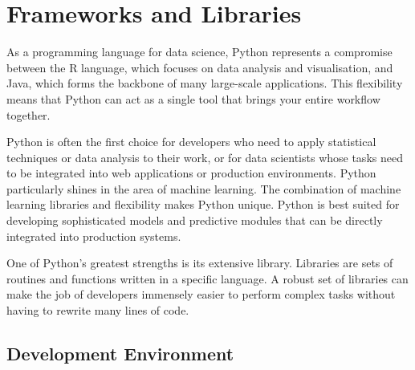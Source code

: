 %
%




\chapter{Frameworks and Libraries}




As a programming language for data science, Python represents a compromise between the R language, which focuses on data analysis and visualisation, and Java, which forms the backbone of many large-scale applications. This flexibility means that Python can act as a single tool that brings your entire workflow together.

Python is often the first choice for developers who need to apply statistical techniques or data analysis to their work, or for data scientists whose tasks need to be integrated into web applications or production environments. Python particularly shines in the area of machine learning. The combination of machine learning libraries and flexibility makes Python unique. Python is best suited for developing sophisticated models and predictive modules that can be directly integrated into production systems.

One of Python's greatest strengths is its extensive library. Libraries are sets of routines and functions written in a specific language. A robust set of libraries can make the job of developers immensely easier to perform complex tasks without having to rewrite many lines of code. 



\section{Development Environment}


